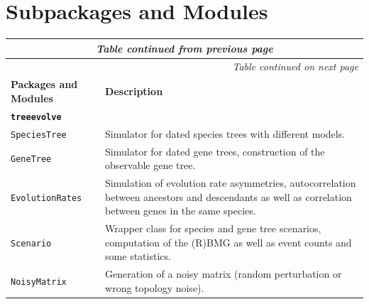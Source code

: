 \documentclass[hidelinks,11pt]{article}
\begin{document}



\newpage


\appendix

\section{Subpackages and Modules}\label{apx:package_structure}

{\footnotesize
\setlength{\tabcolsep}{6pt}
\renewcommand{\arraystretch}{1.4}
\begin{longtable}{| p{4.0cm} | p{10cm} |}
	\endfirsthead
	\multicolumn{2}{c}{\textit{Table continued from previous page}}\\
	\hline
	\endhead
	\hline \multicolumn{2}{r}{\textit{Table continued on next page}} \\
	\endfoot
	\hline
	\endlastfoot
	\hline
	\textbf{Packages and Modules} & \textbf{Description} \\
	\hline
	\multicolumn{2}{|l|}{\textbf{\texttt{treeevolve}}}\\
	\hline
	\texttt{SpeciesTree} & 
	Simulator for dated species trees with different models. \\
	\texttt{GeneTree} & 
	Simulator for dated gene trees, construction of the observable gene tree. \\
	\texttt{EvolutionRates} & 
	Simulation of evolution rate asymmetries, autocorrelation between ancestors and descendants as well as correlation between genes in the same species. \\
	\texttt{Scenario} & 
	Wrapper class for species and gene tree scenarios, computation of the (R)BMG as well as event counts and some statistics. \\
	\texttt{NoisyMatrix} & 
	Generation of a noisy matrix (random perturbation or wrong topology noise). \\

\end{longtable}}
\end{document}
